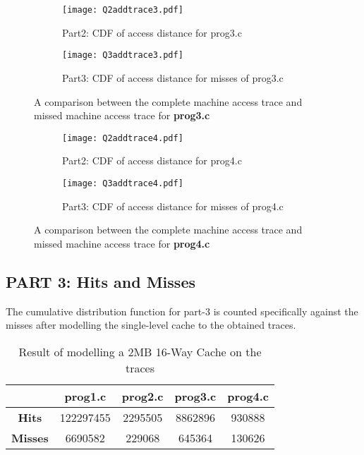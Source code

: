 \begin{figure}[H]
\centering
\begin{subfigure}{.48\textwidth}
  \centering
  \texttt{[image: Q2addtrace3.pdf]}
  \caption{Part2: CDF of access distance for prog3.c}
  \label{fig:3sub1}
\end{subfigure}%
\hspace{2mm}
\begin{subfigure}{.465\textwidth}
  \centering
  \texttt{[image: Q3addtrace3.pdf]}
  \caption{Part3: CDF of access distance for misses of prog3.c}
  \label{fig:3sub2}
\end{subfigure}
\caption{A comparison between the complete machine access trace and missed machine access trace for \textbf{prog3.c}}
\label{fig:test3}
\vspace{0.8in}
\begin{subfigure}{.48\textwidth}
  \centering
  \texttt{[image: Q2addtrace4.pdf]}
  \caption{Part2: CDF of access distance for prog4.c}
  \label{fig:3sub3}
\end{subfigure}%
\hspace{2mm}
\begin{subfigure}{.465\textwidth}
  \centering
  \texttt{[image: Q3addtrace4.pdf]}
  \caption{Part3: CDF of access distance for misses of prog4.c}
  \label{fig:3sub4}
\end{subfigure}
\caption{A comparison between the complete machine access trace and missed machine access trace for \textbf{prog4.c}}
\label{fig:test4}
\end{figure}


\newpage
\subsection*{PART 3: Hits and Misses}
The cumulative distribution function for part-3 is counted specifically against the misses after
modelling the single-level cache to the obtained traces.
\begin{table}[h]
\centering
\begin{tabular}{ |c|c|c|c|c| } 
\hline
& \textbf{prog1.c} & \textbf{prog2.c} & \textbf{prog3.c} & \textbf{prog4.c} \\
\hline
\textbf{Hits}   & 122297455 & 2295505 & 8862896 & 930888 \\
\hline
\textbf{Misses} & 6690582   & 229068  & 645364  & 130626 \\
\hline
\end{tabular}
\caption{Result of modelling a 2MB 16-Way Cache on the traces}
\end{table}